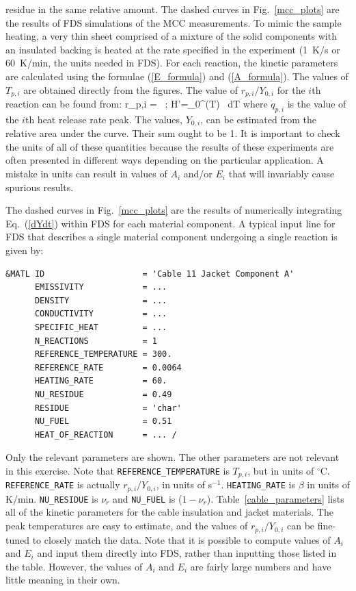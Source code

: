 \documentclass[11pt]{book}
\newcommand{\ct}{\tt\small}
\begin{document}
residue in the same relative amount.
The dashed curves in Fig.~\ref{mcc_plots} are the results of FDS simulations of the MCC measurements. To mimic the
sample heating, a very thin sheet comprised of a mixture of the solid components with an insulated backing is heated at the
rate specified in the experiment (1~K/s or 60~K/min, the units needed in FDS).
For each reaction,
the kinetic parameters are calculated using the formulae (\ref{E_formula}) and (\ref{A_formula}). The values of
$T_{p,i}$ are obtained directly from the figures. The value of $r_{p,i}/Y_{0,i}$ for the $i$th reaction can be found from:
\be
   r_{p,i} = \beta \,    \quad ; \quad
   \Delta H'=\int_0^\infty {}(T) \, dT   \label{r_formula}
\ee
where $\dot{q}_{p,i}$ is the value of the $i$th heat release rate peak. The values, $Y_{0,i}$, can be estimated from the
relative area under the curve. Their sum ought to be 1.
It is important to check the units of all of these quantities because the
results of these experiments are often presented in different ways depending on the particular application. A mistake
in units can result in values of $A_i$ and/or $E_i$ that will invariably cause spurious results.

The dashed curves in Fig.~\ref{mcc_plots} are the results of numerically integrating Eq.~(\ref{dYdt}) within FDS for each
material component. A typical input line for FDS that describes a single material component undergoing a single
reaction is given by:

\footnotesize
\begin{verbatim}
&MATL ID                    = 'Cable 11 Jacket Component A'
      EMISSIVITY            = ...
      DENSITY               = ...
      CONDUCTIVITY          = ...
      SPECIFIC_HEAT         = ...
      N_REACTIONS           = 1
      REFERENCE_TEMPERATURE = 300.
      REFERENCE_RATE        = 0.0064
      HEATING_RATE          = 60.
      NU_RESIDUE            = 0.49
      RESIDUE               = 'char'
      NU_FUEL               = 0.51
      HEAT_OF_REACTION      = ... /
\end{verbatim} \normalsize

\noindent Only the relevant parameters are shown. The other parameters are not relevant in this
exercise. Note that {\ct REFERENCE\_TEMPERATURE} is $T_{p,i}$, but in units of $^\circ$C. {\ct REFERENCE\_RATE} is actually
$r_{p,i}/Y_{0,i}$, in units of s$^{-1}$. {\ct HEATING\_RATE} is $\beta$ in units of K/min.
{\ct NU\_RESIDUE} is $\nu_r$ and {\ct NU\_FUEL} is ($1-\nu_r$).
Table~\ref{cable_parameters} lists all of the kinetic parameters for the cable insulation and jacket
materials. The peak temperatures are easy to estimate, and the values of $r_{p,i}/Y_{0,i}$ can be fine-tuned to closely match
the data. Note that it is possible to compute values of $A_i$ and $E_i$ and input them directly into FDS, rather
than inputting those listed in the table. However, the values of $A_i$ and $E_i$ are fairly large numbers and have little
meaning in their own.
\end{document}
